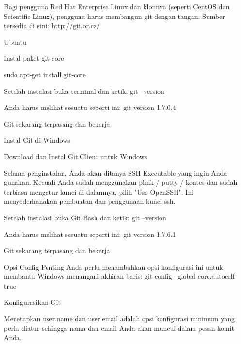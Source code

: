 \noindent 
Bagi pengguna Red Hat Enterprise Linux dan klonnya (seperti CentOS dan Scientific Linux), pengguna harus membangun git dengan tangan. $  $Sumber tersedia di sini: $  $http://git.or.cz/ \par
\vspace{12pt}
\noindent 
 $  $Ubuntu \par
\vspace{12pt}
\noindent 
Instal paket $  $git-core \par
\vspace{12pt}
\noindent 
sudo apt-get install git-core \par
\vspace{12pt}
\noindent 
Setelah instalasi buka terminal dan ketik: $  $git --version \par
\noindent 
Anda harus melihat sesuatu seperti ini: $  $git version 1.7.0.4 \par
\noindent 
Git sekarang terpasang dan bekerja \par
\vspace{12pt}
\noindent 
 $  $Instal Git di Windows \par
\vspace{12pt}
\noindent 
Download dan Instal Git Client untuk Windows \par
\noindent 
Selama penginstalan, Anda akan ditanya SSH Executable yang ingin Anda gunakan. $  $Kecuali Anda sudah menggunakan plink / putty / kontes dan sudah terbiasa mengatur kunci di dalamnya, pilih "Use OpenSSH". $  $Ini menyederhanakan pembuatan dan penggunaan kunci ssh. \par
\vspace{12pt}
\noindent 
Setelah instalasi buka Git Bash dan ketik: $  $git --version \par
\vspace{12pt}
\noindent 
Anda harus melihat sesuatu seperti ini: $  $git version 1.7.6.1 \par
\noindent 
Git sekarang terpasang dan bekerja \par
\vspace{12pt}
\noindent 
Opsi Config Penting $  $Anda perlu menambahkan opsi konfigurasi ini untuk membantu Windows menangani akhiran baris: $  $git config --global core.autocrlf true \par
\vspace{12pt}
\noindent 
 $  $Konfigurasikan Git \par
\vspace{12pt}
\noindent 
Menetapkan $  $user.name $  $dan $  $user.email $  $adalah opsi konfigurasi minimum yang perlu diatur sehingga nama dan email Anda akan muncul dalam pesan komit Anda. \par
